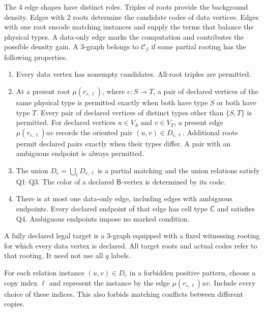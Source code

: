 \documentclass[10pt]{article}
\numberwithin{equation}{section}
\theoremstyle{definition}
\begin{document}
The 4 edge shapes have distinct roles. Triples of roots provide the background density. Edges with 2 roots determine the candidate codes of data vertices. Edges with one root encode matching instances and supply the terms that balance the physical types. A data-only edge marks the computation and contributes the possible density gain. A $3$-graph belongs to $\mathcal C_\beta$ if some partial rooting has the following properties.
\begin{enumerate}[label=\textnormal{(H\arabic*)},leftmargin=*]
\item Every data vertex has nonempty candidates. All-root triples are
permitted.
\item At a present root $\mu(r_{e,\ell})$, where $e\colon S\to T$, a pair of declared vertices of the same physical type is permitted exactly when both have type $S$ or both have type $T$. Every pair of declared vertices of distinct types other than $\{S,T\}$ is permitted. For declared vertices $u\in V_S$ and $v\in V_T$, a present edge $\mu(r_{e,\ell})uv$ records the oriented pair $(u,v)\in D_{e,\ell}$. Additional roots permit declared pairs exactly when their types differ. A pair with an ambiguous endpoint is always permitted.
\item The union $D_e=\bigcup_\ell D_{e,\ell}$ is a partial matching
and the union relations satisfy Q1--Q3. The color of a declared $\mathsf B$-vertex is determined by its code.
\item There is at most one data-only edge, including edges with
ambiguous endpoints. Every declared endpoint of that edge has cell type $\mathsf C$ and satisfies Q4. Ambiguous endpoints impose no marked condition.
\end{enumerate}
A fully declared legal target is a $3$-graph equipped with a fixed witnessing rooting for which every data vertex is declared. All target roots and actual codes refer to that rooting. It need not use all $q$ labels.

For each relation instance $(u,v)\in D_e$ in a forbidden positive pattern, choose a copy index $\ell$ and represent the instance by the edge $\mu(r_{e,\ell})uv$. Include every choice of these indices. This also forbids matching conflicts between different copies.
\end{document}
